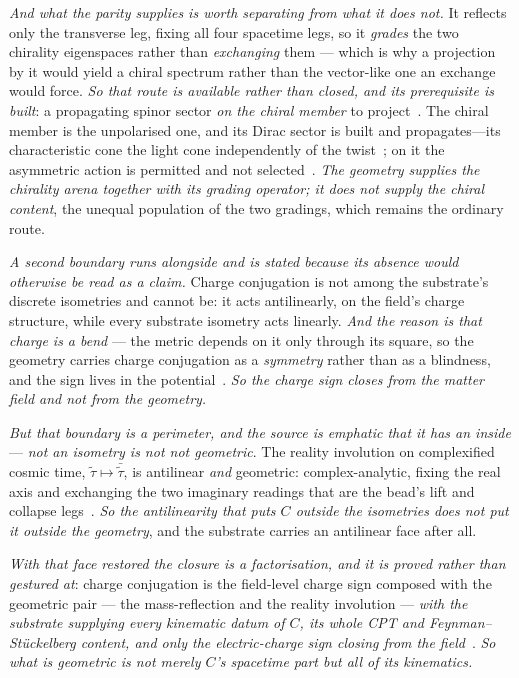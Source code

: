 \documentclass[11pt,a4paper]{article}
\theoremstyle{plain}
\theoremstyle{definition}
\begin{document}
\emph{And what the parity supplies is worth separating from what it does not.} It reflects only the
transverse leg, fixing all four spacetime legs, so it \emph{grades} the two chirality eigenspaces rather than
\emph{exchanging} them --- which is why a projection by it would yield a chiral spectrum rather than the
vector-like one an exchange would force. \emph{So that route is available rather than closed, and its prerequisite is built}: a propagating spinor sector \emph{on the chiral member} to project~\cite{JanzenBoundary}. The chiral member is the unpolarised one, and its Dirac sector is built and propagates---its characteristic cone the light cone independently of the twist~\cite{JanzenDynamics}; on it the asymmetric action is permitted and not selected~\cite{JanzenMatter}.
\emph{The geometry supplies the chirality arena together with its grading operator; it does not supply the
chiral content}, the unequal population of the two gradings, which remains the ordinary route.

\emph{A second boundary runs alongside and is stated because its absence would otherwise be read as a
claim.} Charge conjugation is not among the substrate's discrete isometries and cannot be: it acts
antilinearly, on the field's charge structure, while every substrate isometry acts linearly. \emph{And the
reason is that charge is a bend} --- the metric depends on it only through its square, so the geometry
carries charge conjugation as a \emph{symmetry} rather than as a blindness, and the sign lives in the
potential~\cite{JanzenBoundary,JanzenRange}. \emph{So the charge sign closes from the matter field and not from the geometry.}

\emph{But that boundary is a perimeter, and the source is emphatic that it has an inside} --- \emph{not an
isometry is not not geometric}. The reality involution on complexified cosmic time, $\tilde\tau\mapsto
\bar{\tilde\tau}$, is antilinear \emph{and} geometric: complex-analytic, fixing the real axis and exchanging
the two imaginary readings that are the bead's lift and collapse legs~\cite{JanzenBoundary}. \emph{So the
antilinearity that puts $C$ outside the isometries does not put it outside the geometry}, and the
substrate carries an antilinear face after all.

\emph{With that face restored the closure is a factorisation, and it is proved rather than gestured at}:
charge conjugation is the field-level charge sign composed with the geometric pair --- the mass-reflection
and the reality involution --- \emph{with the substrate supplying every kinematic datum of $C$, its whole
CPT and Feynman--St\"uckelberg content, and only the electric-charge sign closing from the
field}~\cite{JanzenBoundary}. \emph{So what is geometric is not merely $C$'s spacetime part but all of its kinematics.}
\end{document}
